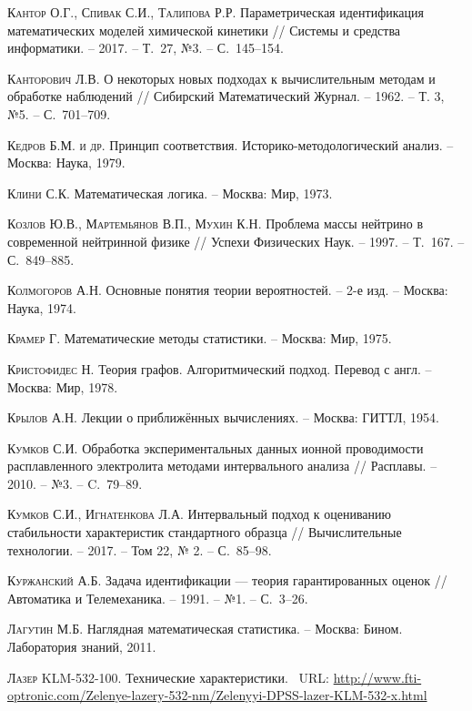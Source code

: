 \documentclass[a5paper,openany]{book}
\begin{document}
\begin{thebibliography}{999}
\textsc{Кантор О.Г., Спивак С.И., Талипова Р.Р.} Параметрическая идентификация 
математических моделей химической кинетики // Системы и средства информатики. -- 2017. 
-- Т.~27, №3. -- С.~145--154. 
  
\textsc{Канторович Л.В.} О некоторых новых подходах к вычислительным методам и обработке 
наблюдений // Сибирский Математический Журнал. -- 1962. -- Т. 3, №5. -- С.~701--709. 
  
\textsc{Кедров Б.М. и др.} Принцип соответствия. Историко-методологический анализ. 
-- Москва: Наука, 1979. 
  
\textsc{Клини С.К.} Математическая логика. -- Москва: Мир, 1973. 
  
\textsc{Козлов Ю.В., Мартемьянов В.П., Мухин К.Н.} Проблема массы нейтрино 
в современной нейтринной физике // Успехи Физических Наук. -- 1997. -- Т.~167. 
-- С.~849--885. 
  
\textsc{Колмогоров А.Н.} Основные понятия теории вероятностей. -- 2-е изд. -- Москва: 
Наука, 1974. 
   
\textsc{Крамер Г.} Математические методы статистики. -- Москва: Мир, 1975.   
  
\textsc{Кристофидес Н.} Теория графов. Алгоритмический подход. Перевод с англ. 
-- Москва: Мир, 1978. 
  
\textsc{Крылов А.Н.} Лекции о приближённых вычислениях. -- Москва: ГИТТЛ, 1954. 
  
\textsc{Кумков С.И.} Обработка экспериментальных данных ионной проводимости 
расплавленного электролита методами интервального анализа // Расплавы. -- 2010. 
-- №3. -- C.~79--89. 
  
\textsc{Кумков С.И., Игнатенкова Л.А.} Интервальный подход к оцениванию стабильности 
характеристик стандартного образца // Вычислительные технологии. -- 2017. -- Том 22, 
№ 2. -- С.~85--98. 
  
\textsc{Куржанский А.Б.} Задача идентификации --- теория гарантированных оценок // 
Автоматика и Телемеханика. -- 1991. -- №1. -- С.~3--26. 
  
\textsc{Лагутин М.Б.} Наглядная математическая статистика. -- Москва: Бином. 
Лаборатория знаний, 2011. 
  
\textsc{Лазер KLM-532-100.} Технические характеристики. \  URL: 
\url{http://www.fti-optronic.com/Zelenye-lazery-532-nm/Zelenyyi-DPSS-lazer-KLM-532-x.html} 
  

\end{thebibliography}
\end{document}
